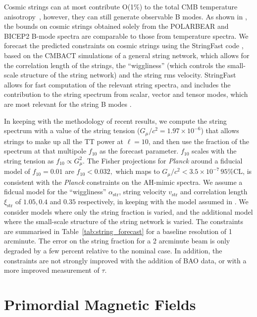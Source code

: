 Cosmic strings can at most contribute O(1\%) to the total CMB temperature anisotropy~\cite{Ade:2013xla,Lizarraga:2014xza,Lazanu:2014eya}, however, they can still generate observable B modes. As shown in \cite{Moss:2014cra}, the bounds on cosmic strings obtained solely from the POLARBEAR \cite{Ade:2014afa} and BICEP2  \cite{Ade:2014xna} B-mode spectra are comparable to those from temperature spectra. 
We forecast the predicted constraints on cosmic strings using the StringFast code \cite{Foreman:2011uj}, based on the CMBACT simulations \cite{Pogosian:1999np} of a general string network, which allows for the correlation length of the strings, the ``wiggliness'' (which controls the small-scale structure of the string network) and the string rms velocity. StringFast allows for fast computation of the relevant string spectra, and includes the contribution to the string spectrum from scalar, vector and tensor modes, which are most relevant for the string B modes \cite{Foreman:2011uj}.

In keeping with the methodology of recent results, we compute the string spectrum with a value of the string tension ($G_\mu/c^2=1.97\times10^{-6}$) that allows strings to make up all the TT power at $\ell=10$, and then use the fraction of the spectrum at that multipole $f_{10}$ as the forecast parameter. $f_{10}$ scales with the string tension as $f_{10} \propto G_\mu^2.$ The Fisher projections for {\it Planck\/} around a fiducial model of $f_{10}=0.01$ are $f_{10}<0.032,$ which maps to $G_\mu/c^2 < 3.5\times 10^{-7}\, 95\% \mathrm{CL}$, is consistent with the {\it Planck\/} constraints on the AH-mimic spectra.
We assume a fidcual model for the ``wiggliness'' $\alpha_\mathrm{str}$, string velocity $v_\mathrm{str}$ and correlation length $\xi_\mathrm{str}$ of $1.05, 0.4$ and $0.35$ respectively, in keeping with the model assumed in \cite{Foreman:2011uj}. We consider models where only the string fraction is varied, and the additional model where the small-scale structure of the string network is varied. The constraints are summarised in Table~\ref{tab:string_forecast} for a baseline resolution of 1 arcminute. The error on the string fraction for a 2 arcminute beam is only degraded by a few percent relative to the nominal case. In addition, the constraints are not strongly improved with the addition of BAO data, or with a more improved measurement of $\tau$.


\section{Primordial Magnetic Fields}

